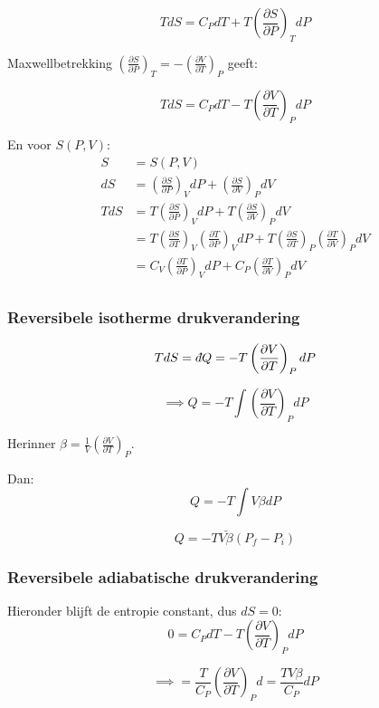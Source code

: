 \[
\boxed{TdS = C_PdT + T\left(\frac{\partial S}{\partial P}\right)_T dP} 
\]

Maxwellbetrekking \(\left(\frac{\partial S}{\partial P}\right)_T = -\left(\frac{\partial V}{\partial T}\right)_P\) geeft:

\[\boxed{TdS = C_PdT - T\left(\frac{\partial V}{\partial T}\right)_P dP}\]



En voor \(S(P,V)\):
\begin{align*}
    S &= S(P,V) \\
    dS &= \left(\frac{\partial S}{\partial P}\right)_V dP + \left(\frac{\partial S}{\partial V}\right)_P dV \\
    TdS &= T\left(\frac{\partial S}{\partial P}\right)_V dP + T\left(\frac{\partial S}{\partial V}\right)_P dV \\
    &= T\left(\frac{\partial S}{\partial T}\right)_V\left(\frac{\partial T}{\partial P}\right)_V dP + T\left(\frac{\partial S}{\partial T}\right)_P \left(\frac{\partial T}{\partial V}\right)_P dV \\
    &= C_V\left(\frac{\partial T}{\partial P}\right)_V dP + C_P \left(\frac{\partial T}{\partial V}\right)_P dV \\
\end{align*}

\subsubsection{Reversibele isotherme drukverandering}

\[TdS = \dbar Q= -T \left(\frac{\partial V}{\partial T}\right)_P dP\]

\[\implies Q= -T \int \left(\frac{\partial V}{\partial T}\right)_P dP\]

Herinner \(\beta = \frac{1}{V}\left(\frac{\partial V}{\partial T}\right)_P\).

Dan:
\[Q = -T \int V \beta dP\]

\[Q = -T \bar{V \beta} (P_f - P_i)\]

\subsubsection{Reversibele adiabatische drukverandering}

Hieronder blijft de entropie constant, dus \(dS = 0\):
\[0 = C_P dT - T \left(\frac{\partial V}{\partial T}\right)_P dP\]

\[\implies  = \frac{T}{C_P}\left(\frac{\partial V}{\partial T}\right)_P d = \frac{TV \beta}{C_P}dP\]


